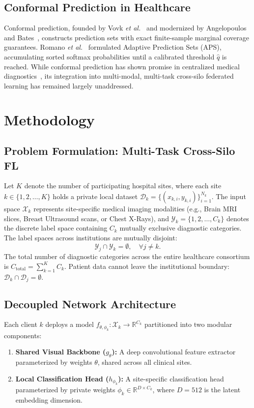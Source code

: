 \documentclass[journal]{IEEEtran}
\begin{document}
\subsection{Conformal Prediction in Healthcare}
Conformal prediction, founded by Vovk \textit{et al.}~\cite{vovk2005algorithmic} and modernized by Angelopoulos and Bates~\cite{angelopoulos2023conformal}, constructs prediction sets with exact finite-sample marginal coverage guarantees. Romano \textit{et al.}~\cite{romano2020classification} formulated Adaptive Prediction Sets (APS), accumulating sorted softmax probabilities until a calibrated threshold $\hat{q}$ is reached. While conformal prediction has shown promise in centralized medical diagnostics~\cite{lu2022fair}, its integration into multi-modal, multi-task cross-silo federated learning has remained largely unaddressed.

\section{Methodology}

\subsection{Problem Formulation: Multi-Task Cross-Silo FL}
Let $K$ denote the number of participating hospital sites, where each site $k \in \{1, 2, \dots, K\}$ holds a private local dataset $\mathcal{D}_k = \{ (x_{k,i}, y_{k,i}) \}_{i=1}^{N_k}$. The input space $\mathcal{X}_k$ represents site-specific medical imaging modalities (e.g., Brain MRI slices, Breast Ultrasound scans, or Chest X-Rays), and $\mathcal{Y}_k = \{1, 2, \dots, C_k\}$ denotes the discrete label space containing $C_k$ mutually exclusive diagnostic categories. The label spaces across institutions are mutually disjoint:
\begin{equation}
\mathcal{Y}_j \cap \mathcal{Y}_k = \emptyset, \quad \forall j \neq k.
\end{equation}
The total number of diagnostic categories across the entire healthcare consortium is $C_{\text{total}} = \sum_{k=1}^K C_k$. Patient data cannot leave the institutional boundary: $\mathcal{D}_k \cap \mathcal{D}_j = \emptyset$.

\subsection{Decoupled Network Architecture}
Each client $k$ deploys a model $f_{\theta, \phi_k}: \mathcal{X}_k \to \mathbb{R}^{C_k}$ partitioned into two modular components:
\begin{enumerate}
    \item \textbf{Shared Visual Backbone ($g_\theta$):} A deep convolutional feature extractor parameterized by weights $\theta$, shared across all clinical sites.
    \item \textbf{Local Classification Head ($h_{\phi_k}$):} A site-specific classification head parameterized by private weights $\phi_k \in \mathbb{R}^{D \times C_k}$, where $D=512$ is the latent embedding dimension.
\end{enumerate}
\end{document}
